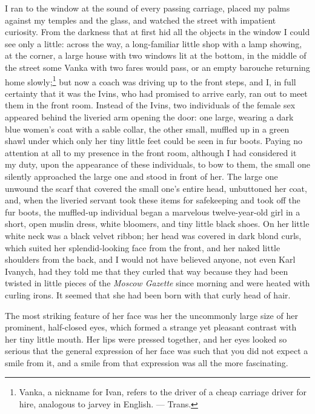 I ran to the window at the sound of every passing carriage, placed my palms against my temples and the glass, and watched the street with impatient curiosity. From the darkness that at first hid all the objects in the window I could see only a little: across the way, a long-familiar little shop with a lamp showing, at the corner, a large house with two windows lit at the bottom, in the middle of the street some Vanka with two fares would pass, or an empty barouche returning home slowly;\footnote{Vanka, a nickname for Ivan, refers to the driver of a cheap carriage driver for hire, analogous to jarvey in English. --- Trans.} but now a coach was driving up to the front steps, and I, in full certainty that it was the Ivins, who had promised to arrive early, ran out to meet them in the front room. Instead of the Ivins, two individuals of the female sex appeared behind the liveried arm opening the door: one large, wearing a dark blue women's coat with a sable collar, the other small, muffled up in a green shawl under which only her tiny little feet could be seen in fur boots. Paying no attention at all to my presence in the front room, although I had considered it my duty, upon the appearance of these individuals, to bow to them, the small one silently approached the large one and stood in front of her. The large one unwound the scarf that covered the small one's entire head, unbuttoned her coat, and, when the liveried servant took these items for safekeeping and took off the fur boots, the muffled-up individual began a marvelous twelve-year-old girl in a short, open muslin dress, white bloomers, and tiny little black shoes. On her little white neck was a black velvet ribbon; her head was covered in dark blond curls, which suited her splendid-looking face from the front, and her naked little shoulders from the back, and I would not have believed anyone, not even Karl Ivanych, had they told me that they curled that way because they had been twisted in little pieces of the \textit{Moscow Gazette} since morning and were heated with curling irons. It seemed that she had been born with that curly head of hair.

The most striking feature of her face was her the uncommonly large size of her prominent, half-closed eyes, which formed a strange yet pleasant contrast with her tiny little mouth. Her lips were pressed together, and her eyes looked so serious that the general expression of her face was such that you did not expect a smile from it, and a smile from that expression was all the more fascinating.

